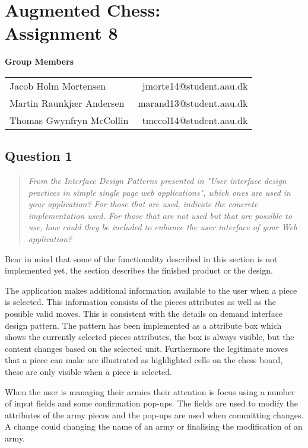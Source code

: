 \documentclass[10pt,a4paper]{report}
\begin{document}
\chapter{Augmented Chess:\\ Assignment 8}

\begin{center}
{\Large \textbf{Group Members}}

\begin{tabular}{l r}
Jacob Holm Mortensen            &       jmorte14@student.aau.dk\\
Martin Raunkjær Andersen        &       marand13@student.aau.dk\\
Thomas Gwynfryn McCollin        &       tmccol14@student.aau.dk
\end{tabular}
\end{center}

\section{Question 1}
\begin{quote}
\textit{From the Interface Design Patterns presented in "User interface design practices in simple single page web applications", which ones are used in your application? For those that are used, indicate the concrete implementation used. For those that are not used but that are possible to use, how could they be included to enhance the user interface of your Web application?}
\end{quote}
Bear in mind that some of the functionality described in this section is not implemented yet, the section describes the finished product or the design.


The application makes additional information available to the user when a piece is selected. This information consists of the pieces attributes as well as the possible valid moves. This is consistent with the details on demand interface design pattern. The pattern has been implemented as a attribute box which shows the currently selected pieces attributes, the box is always visible, but the content changes based on the selected unit. Furthermore the legitimate moves that a piece can make are illustrated as highlighted cells on the chess board, these are only visible when a piece is selected.


When the user is managing their armies their attention is focus using a number of input fields and some confirmation pop-ups. The fields are used to modify the attributes of the army pieces and the pop-ups are used when committing changes. A change could changing the name of an army or finalising the modification of an army.
\end{document}
